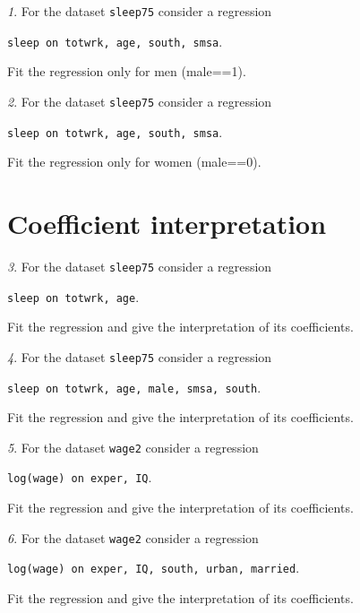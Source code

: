 \documentclass[12pt]{article}
\theoremstyle{remark}
\newtheorem{problem}{}[section]
\begin{document}
\begin{problem}
For the dataset \texttt{sleep75} consider a regression
\begin{center}
	\texttt{sleep on totwrk, age, south, smsa}.
\end{center}
Fit the regression only for men (male==1).
\end{problem}

\begin{problem}
For the dataset \texttt{sleep75} consider a regression
\begin{center}
	\texttt{sleep on totwrk, age, south, smsa}.
\end{center}
Fit the regression only for women (male==0).
\end{problem}

\section{Coefficient interpretation}

\begin{problem}
For the dataset \texttt{sleep75} consider a regression
\begin{center}
\texttt{sleep on totwrk, age}.
\end{center}
Fit the regression and give the interpretation of its coefficients.
\end{problem}

\begin{problem}
For the dataset \texttt{sleep75} consider a regression
\begin{center}
\texttt{sleep on totwrk, age, male, smsa, south}.
\end{center}
Fit the regression and give the interpretation of its coefficients.
\end{problem}

\begin{problem}
For the dataset \texttt{wage2} consider a regression
\begin{center}
\texttt{log(wage) on exper, IQ}.
\end{center}
Fit the regression and give the interpretation of its coefficients.
\end{problem}

\begin{problem}
For the dataset \texttt{wage2} consider a regression
\begin{center}
\texttt{log(wage) on exper, IQ, south, urban, married}.
\end{center}
Fit the regression and give the interpretation of its coefficients.
\end{problem}
\end{document}
